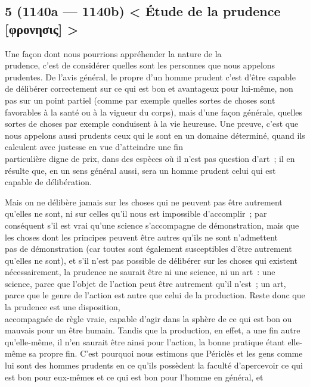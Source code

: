 \documentclass[french,twoside]{book} %
\begin{document}
\subsection[{5 (1140a — 1140b) < Étude de la prudence [φρονησις] >}]{5 (1140a — 1140b) < Étude de la prudence [φρονησις] >}
 Une façon dont nous pourrions appréhender la nature de la \\
prudence, c’est de considérer quelles sont les personnes que nous appelons prudentes. De l’avis général, le propre d’un homme prudent c’est d’être capable de délibérer correctement sur ce qui est bon et avantageux pour lui-même, non pas sur un point partiel (comme par exemple quelles sortes de choses sont favorables à la santé ou à la vigueur du corps), mais d’une façon générale, quelles sortes de choses par exemple conduisent à la vie heureuse. Une preuve, c’est que nous appelons aussi prudents ceux qui le sont en un domaine déterminé, quand ils calculent avec justesse en vue d’atteindre une fin \\
particulière digne de prix, dans des espèces où il n’est pas question d’art ; il en résulte que, en un sens général aussi, sera un homme prudent celui qui est capable de délibération.\par
Mais on ne délibère jamais sur les choses qui ne peuvent pas être autrement qu’elles ne sont, ni sur celles qu’il nous est impossible d’accomplir ; par conséquent s’il est vrai qu’une science s’accompagne de démonstration, mais que les choses dont les principes peuvent être autres qu’ils ne sont n’admettent \\
pas de démonstration (car toutes sont également susceptibles d’être autrement qu’elles ne sont), et s’il n’est pas  possible de délibérer sur les choses qui existent nécessairement, la prudence ne saurait être ni une science, ni un art : une science, parce que l’objet de l’action peut être autrement qu’il n’est ; un art, parce que le genre de l’action est autre que celui de la production. Reste donc que la prudence est une disposition, \\
accompagnée de règle vraie, capable d’agir dans la sphère de ce qui est bon ou mauvais pour un être humain. Tandis que la production, en effet, a une fin autre qu’elle-même, il n’en saurait être ainsi pour l’action, la bonne pratique étant elle-même sa propre fin. C’est pourquoi nous estimons que Périclès et les gens comme lui sont des hommes prudents en ce qu’ils possèdent la faculté d’apercevoir ce qui est bon pour eux-mêmes et ce qui est bon pour l’homme en général, et \\
\end{document}
